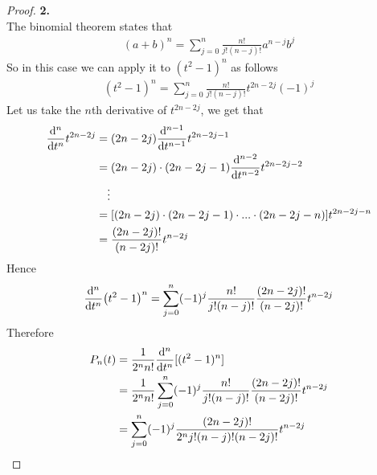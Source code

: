 \documentclass[11pt]{article}
\theoremstyle{definition}
\begin{document}
\cleardoublepage
\begin{proof}{\textbf{2.}}\\
The binomial theorem states that
\begin{align*}
    (a + b)^n = \sum_{j=0}^n \frac{n!}{j! (n -j)!} a^{n-j} b^j
\end{align*}
So in this case we can apply it to $(t^2 - 1)^n$ as follows
\begin{align*}
    (t^2 - 1)^n = \sum_{j=0}^n \frac{n!}{j! (n -j)!} t^{2n-2j} (-1)^j
\end{align*}
Let us take the $n$th derivative of $t^{2n - 2j}$, we get that
\begin{align*}
    \dv[n]{t}t^{2n-2j}
    &= (2n - 2j) \dv[n-1]{t}t^{2n - 2j - 1}\\ 
    &= (2n - 2j)\cdot(2n - 2j - 1) \dv[n-2]{t}t^{2n - 2j - 2}\\
    &\quad\vdots\\
    &= [(2n - 2j)\cdot(2n - 2j - 1)\cdot ... \cdot(2n - 2j - n)]t^{2n - 2j - n}\\
    &= \frac{(2n - 2j)!}{(n - 2j)!}t^{n - 2j}
\end{align*}
Hence
\begin{align*}
    \dv[n]{t}(t^2 - 1)^n = \sum_{j=0}^n (-1)^j \frac{n!}{j! (n -j)!}
    \frac{(2n - 2j)!}{(n - 2j)!}t^{n - 2j}
\end{align*}
Therefore
\begin{align*}
    P_n(t) &= \frac{1}{2^n n!}\dv[n]{t}[(t^2 - 1)^n] \\
    &= \frac{1}{2^n n!}\sum_{j=0}^n (-1)^j \frac{n!}{j! (n -j)!}
    \frac{(2n - 2j)!}{(n - 2j)!}t^{n - 2j}\\
    &= \sum_{j=0}^n (-1)^j \frac{(2n - 2j)!}{2^n j! (n -j)! (n - 2j)!} t^{n - 2j}
\end{align*}



\end{proof}
\end{document}
